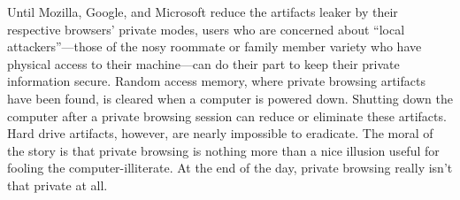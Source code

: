 \documentclass[pdftex,letterpaper,titlepage,12pt]{article}
\begin{document}
  Until Mozilla, Google, and Microsoft reduce the artifacts leaker by their
  respective browsers' private modes, users who are concerned about ``local 
  attackers''---those of the nosy roommate or family member variety who have 
  physical access to their machine---can do their part to keep their private
  information secure. Random access memory, where private browsing artifacts
  have been found, is cleared when a computer is powered down. Shutting down
  the computer after a private browsing session can reduce or eliminate these
  artifacts. Hard drive artifacts, however, are nearly impossible to eradicate.
  The moral of the story is that private browsing is nothing more than a nice
  illusion useful for fooling the computer-illiterate. At the end of the day,
  private browsing really isn't that private at all.
\end{document}

